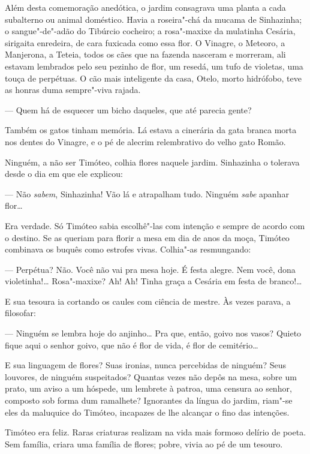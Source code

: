 Além desta comemoração anedótica, o jardim consagrava uma planta a cada
subalterno ou animal doméstico. Havia a roseira"-chá da mucama de
Sinhazinha; o sangue"-de"-adão do Tibúrcio cocheiro; a rosa"-maxixe da
mulatinha Cesária, sirigaita enredeira, de cara fuxicada como essa flor.
O Vinagre, o Meteoro, a Manjerona, a Teteia, todos os cães que na
fazenda nasceram e morreram, ali estavam lembrados pelo seu pezinho de
flor, um resedá, um tufo de violetas, uma touça de perpétuas. O cão mais
inteligente da casa, Otelo, morto hidrófobo, teve as honras duma
sempre"-viva rajada.

--- Quem há de esquecer um bicho daqueles, que até parecia gente?

Também os gatos tinham memória. Lá estava a cinerária da gata branca
morta nos dentes do Vinagre, e o pé de alecrim relembrativo do velho
gato Romão.

Ninguém, a não ser Timóteo, colhia flores naquele jardim. Sinhazinha o
tolerava desde o dia em que ele explicou:

--- Não \emph{sabem}, Sinhazinha! Vão lá e atrapalham tudo. Ninguém
\emph{sabe} apanhar flor\ldots{}

Era verdade. Só Timóteo sabia escolhê"-las com intenção e sempre de
acordo com o destino. Se as queriam para florir a mesa em dia de anos da
moça, Timóteo combinava os buquês como estrofes vivas. Colhia"-as
resmungando:

--- Perpétua? Não. Você não vai pra mesa hoje. É festa alegre. Nem você,
dona violetinha!\ldots{} Rosa"-maxixe? Ah! Ah! Tinha graça a Cesária em festa
de branco!\ldots{}

E sua tesoura ia cortando os caules com ciência de mestre. Às vezes
parava, a filosofar:

--- Ninguém se lembra hoje do anjinho\ldots{} Pra que, então, goivo nos
vasos? Quieto fique aqui o senhor goivo, que não é flor de vida, é flor
de cemitério\ldots{}

E sua linguagem de flores? Suas ironias, nunca percebidas de ninguém?
Seus louvores, de ninguém suspeitados? Quantas vezes não depôs na mesa,
sobre um prato, um aviso a um hóspede, um lembrete à patroa, uma censura
ao senhor, composto sob forma dum ramalhete? Ignorantes da língua do
jardim, riam"-se eles da maluquice do Timóteo, incapazes de lhe alcançar
o fino das intenções.

Timóteo era feliz. Raras criaturas realizam na vida mais formoso delírio
de poeta. Sem família, criara uma família de flores; pobre, vivia ao pé
de um tesouro.

